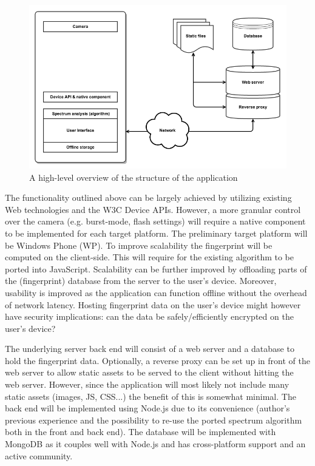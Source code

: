 \documentclass[english,12pt,a4paper,pdftex]{article}
\begin{document}
\begin{figure}[hbs]
\centering \includegraphics[width=13.25cm]{assets/diagram_0404}
\caption{A high-level overview of the structure of the application \label{diagram}}
\end{figure}

The functionality outlined above can be largely achieved by utilizing existing Web technologies and the W3C Device APIs. However, a more granular control over the camera (e.g. burst-mode, flash settings) will require a native component to be implemented for each target platform. The preliminary target platform will be Windows Phone (WP). To improve scalability the fingerprint will be computed on the client-side. This will require for the existing algorithm to be ported into JavaScript. Scalability can be further improved by offloading parts of the (fingerprint) database from the server to the user's device. Moreover, usability is improved as the application can function offline without the overhead of network latency. Hosting fingerprint data on the user's device might however have security implications: can the data be safely/efficiently encrypted on the user's device?

The underlying server back end will consist of a web server and a database to hold the fingerprint data. Optionally, a reverse proxy can be set up in front of the web server to allow static assets to be served to the client without hitting the web server. However, since the application will most likely not include many static assets (images, JS, CSS...) the benefit of this is somewhat minimal. The back end will be implemented using Node.js due to its convenience (author's previous experience and the possibility to re-use the ported spectrum algorithm both in the front and back end). The database will be implemented with MongoDB as it couples well with Node.js and has cross-platform support and an active community.
\end{document}
